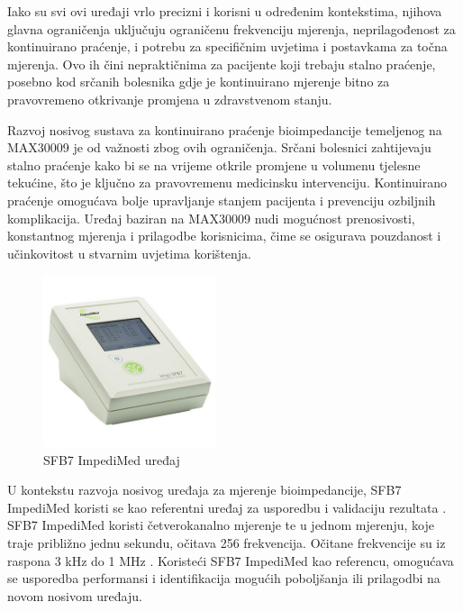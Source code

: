\documentclass[../diplomski_rad.tex]{subfiles}
\begin{document}
Iako su svi ovi uređaji vrlo precizni i korisni u određenim kontekstima, 
njihova glavna ograničenja uključuju ograničenu frekvenciju mjerenja, 
neprilagođenost za kontinuirano praćenje, i potrebu za specifičnim uvjetima i postavkama za točna mjerenja. 
Ovo ih čini nepraktičnima za pacijente koji trebaju stalno praćenje, posebno kod srčanih bolesnika 
gdje je kontinuirano mjerenje bitno za pravovremeno otkrivanje promjena u zdravstvenom stanju.

Razvoj nosivog sustava za kontinuirano praćenje bioimpedancije 
temeljenog na MAX30009 je od važnosti zbog ovih ograničenja. 
Srčani bolesnici zahtijevaju stalno praćenje kako bi se na vrijeme otkrile promjene u volumenu tjelesne tekućine, 
što je ključno za pravovremenu medicinsku intervenciju. Kontinuirano praćenje omogućava bolje 
upravljanje stanjem pacijenta i prevenciju ozbiljnih komplikacija. 
Uređaj baziran na MAX30009 nudi mogućnost prenosivosti, konstantnog mjerenja i prilagodbe korisnicima, 
čime se osigurava pouzdanost i učinkovitost u stvarnim uvjetima korištenja.

\begin{figure}[htb]
    \centering
    \includegraphics[width=0.45\textwidth]{Figures/sfb7.jpg} 
    \caption{SFB7 ImpediMed uređaj \cite{sfb7}}
    \label{slk:sfb7}
\end{figure}

U kontekstu razvoja nosivog uređaja za mjerenje bioimpedancije, SFB7 ImpediMed 
koristi se kao referentni uređaj za usporedbu i validaciju rezultata \cite{sfb7}. 
SFB7 ImpediMed koristi četverokanalno mjerenje te u jednom mjerenju, koje traje približno jednu sekundu, očitava 256 frekvencija. 
Očitane frekvencije su iz raspona 3 kHz do 1 MHz \cite{sfb7}. 
Koristeći SFB7 ImpediMed kao referencu, omogućava se usporedba performansi i identifikacija 
mogućih poboljšanja ili prilagodbi na novom nosivom uređaju. 
\end{document}
